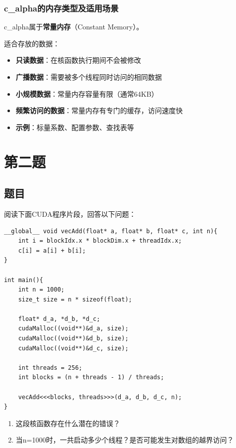 \subsection{c\_alpha的内存类型及适用场景}

c\_alpha属于\textbf{常量内存}（Constant Memory）。

适合存放的数据：
\begin{itemize}
    \item \textbf{只读数据}：在核函数执行期间不会被修改
    \item \textbf{广播数据}：需要被多个线程同时访问的相同数据
    \item \textbf{小规模数据}：常量内存容量有限（通常64KB）
    \item \textbf{频繁访问的数据}：常量内存有专门的缓存，访问速度快
    \item \textbf{示例}：标量系数、配置参数、查找表等
\end{itemize}

\chapter{第二题}

\section{题目}

阅读下面CUDA程序片段，回答以下问题：

\begin{lstlisting}[style=cleancpp]
__global__ void vecAdd(float* a, float* b, float* c, int n){
    int i = blockIdx.x * blockDim.x + threadIdx.x;
    c[i] = a[i] + b[i];
}

int main(){
    int n = 1000;
    size_t size = n * sizeof(float);
    
    float* d_a, *d_b, *d_c;
    cudaMalloc((void**)&d_a, size);
    cudaMalloc((void**)&d_b, size);
    cudaMalloc((void**)&d_c, size);
    
    int threads = 256;
    int blocks = (n + threads - 1) / threads;
    
    vecAdd<<<blocks, threads>>>(d_a, d_b, d_c, n);
}
\end{lstlisting}

\begin{enumerate}
    \item 这段核函数存在什么潜在的错误？
    \item 当n=1000时，一共启动多少个线程？是否可能发生对数组的越界访问？
\end{enumerate}

